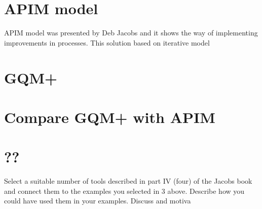 \section{APIM model}

APIM model was presented by Deb Jacobs and it shows the way of implementing improvements in processes. This solution based on iterative model

\section{GQM+}

\section{Compare GQM+ with APIM}

\section{??}
Select a suitable number of tools described in part IV (four) of the Jacobs book and connect them to the examples you selected in 3 above. Describe how you could have used them in your examples. Discuss and motiva